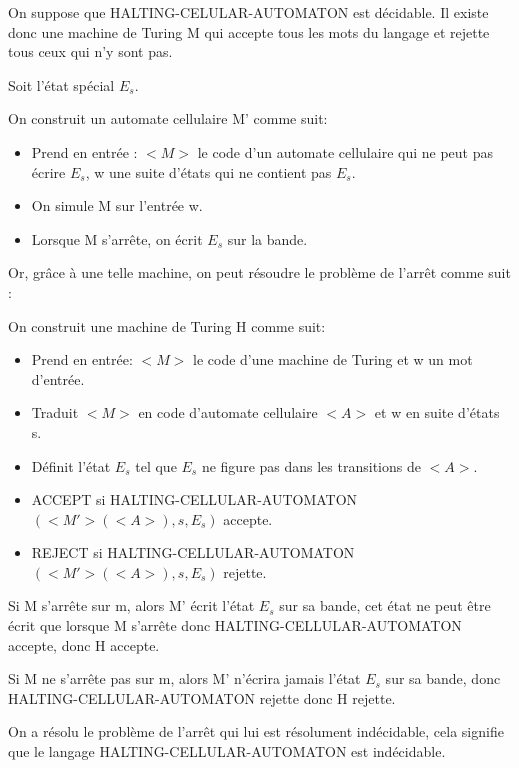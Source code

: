 \documentclass{article}
\begin{document}
      On suppose que HALTING-CELULAR-AUTOMATON est décidable. Il existe donc une machine de Turing M qui accepte tous les mots du langage
    et rejette tous ceux qui n'y sont pas.

    Soit l'état spécial $E_s$.

    On construit un automate cellulaire M' comme suit: 
    \begin{itemize}
    \item Prend en entrée : $<M>$ le code d'un automate cellulaire qui ne peut pas écrire $E_s$, w une suite d'états qui ne contient pas $E_s$.
    \item On simule M sur l'entrée w.
    \item Lorsque M s'arrête, on écrit $E_s$ sur la bande.
    \end{itemize}

    Or, grâce à une telle machine, on peut résoudre le problème de l'arrêt comme suit :

    On construit une machine de Turing H comme suit:
    \begin{itemize}
    \item Prend en entrée: $<M>$ le code d'une machine de Turing et w un mot d'entrée.
    \item Traduit $<M>$ en code d'automate cellulaire $<A>$ et w en suite d'états s.
    \item Définit l'état $E_s$ tel que $E_s$ ne figure pas dans les transitions de $<A>$.
    \item ACCEPT si HALTING-CELLULAR-AUTOMATON $( <M'> (<A>), s, E_s)$ accepte.
    \item REJECT si HALTING-CELLULAR-AUTOMATON $( <M'> (<A>), s, E_s)$ rejette.
    \end{itemize}

    Si M s'arrête sur m, alors M' écrit l'état $E_s$ sur sa bande, cet état ne peut être écrit que lorsque M s'arrête donc HALTING-CELLULAR-AUTOMATON accepte, donc H accepte.

    Si M ne s'arrête pas sur m, alors M' n'écrira jamais l'état $E_s$ sur sa bande, donc HALTING-CELLULAR-AUTOMATON rejette donc H rejette.

    On a résolu le problème de l'arrêt qui lui est résolument indécidable, cela signifie que le langage HALTING-CELLULAR-AUTOMATON est indécidable.
\end{document}
